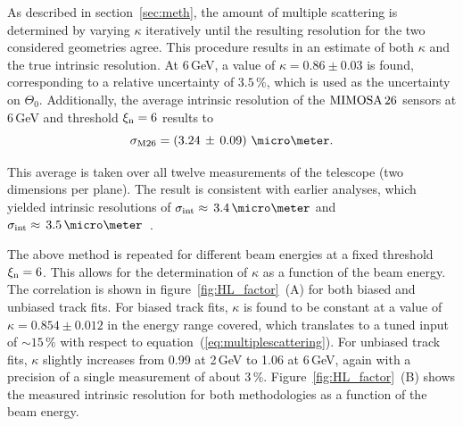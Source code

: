 As described in section~\ref{sec:meth}, the amount of multiple scattering is determined by varying $\kappa$ iteratively until the resulting resolution for the two considered geometries agree. 
This procedure results in an estimate of both $\kappa$ and the true intrinsic resolution. 
At 6\,GeV, a value of $\kappa = 0.86 \pm 0.03$ is found, corresponding to a relative uncertainty of $3.5\,\%$, which is used as the uncertainty on $\Theta_0$. 
Additionally, the average intrinsic resolution of the $\textrm{MIMOSA\,26}$ sensors at 6\,GeV and threshold $\xi_{\textrm{n}} = 6$ results to
\begin{equation}
 \sigma_{\textrm{M26}} = \left( 3.24\,\pm\, 0.09 \right)\,\micro\meter.  
\end{equation}

\noindent
This average is taken over all twelve measurements of the telescope (two dimensions per plane). 
The result is consistent with earlier analyses, which yielded intrinsic resolutions of $\sigmai \approx\,3.4\,\micro\meter$ and $\sigmai \approx\,3.5\,\micro\meter$~\cite{ref:thomas,ref:mimosa26}.

The above method is repeated for different beam energies at a fixed threshold $\xi_{\textrm{n}} = 6$. 
This allows for the determination of $\kappa$ as a function of the beam energy. 
The correlation is shown in figure~\ref{fig:HL_factor}~(A) for both biased and unbiased track fits. 
For biased track fits, $\kappa$ is found to be constant at a value of $\kappa = 0.854 \pm 0.012$ in the energy range covered,
 which translates to a tuned input of $\sim15\,\%$ with respect to equation~(\ref{eq:multiplescattering}). 
For unbiased track fits, $\kappa$ slightly increases from 0.99 at 2\,GeV to 1.06 at 6\,GeV, again with a precision of a single measurement of about $3\,\%$.
Figure~\ref{fig:HL_factor}~(B) shows the measured intrinsic resolution for both methodologies as a function of the beam energy. 

